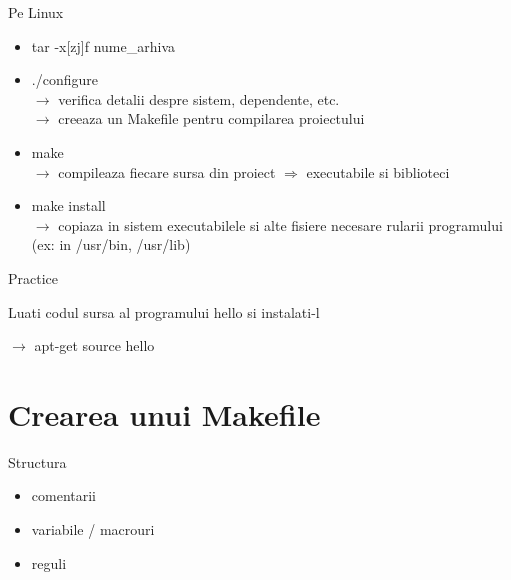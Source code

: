 \documentclass{beamer}
\begin{document}
    \begin{frame}{Pe Linux}
    \begin{itemize}
    \setlength{\itemsep}{0.7cm}
    \item {\ttfamily tar -x[zj]f nume\_arhiva}
    \item {\ttfamily ./configure}\\$\rightarrow$ verifica detalii despre sistem, dependente, etc.\\$\rightarrow$ creeaza un Makefile pentru compilarea proiectului
    \item {\ttfamily make}\\$\rightarrow$ compileaza fiecare sursa din proiect $\Rightarrow$ executabile si biblioteci
    \item {\ttfamily make install}\\$\rightarrow$ copiaza in sistem executabilele si alte fisiere necesare rularii programului (ex: in {\ttfamily /usr/bin, /usr/lib})
    \end{itemize}
    \end{frame}

    \begin{frame}{Practice}
    \par Luati codul sursa al programului hello si instalati-l
    \vspace{0.6cm}
    \par $\rightarrow$ {\ttfamily apt-get source hello}
    \end{frame}

\section{Crearea unui Makefile}
    \frame{\tableofcontents[currentsection]}

    \begin{frame}{Structura}
    \begin{itemize}
    \setlength{\itemsep}{0.6cm}
    \item comentarii
    \item variabile / macrouri
    \item reguli
    \end{itemize}
    \end{frame}
\end{document}
